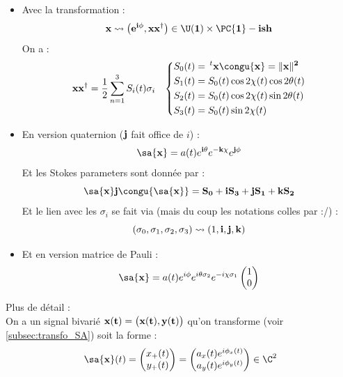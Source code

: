 \begin{itemize}
	
	\item Avec la transformation :
	\[\bf{x} \leadsto \big(e^{i\phi}, \bf{x}\bf{x}^\dagger\big)\in\U(1)\times \PC{1}-ish\]
	On a :
	\begin{align*}
		\bf{x}\bf{x}^\dagger &= \frac{1}{2}\sum_{n=1}^3 S_i(t)\sigma_i  &  \left\{\begin{aligned}
			S_0(t) &=\, ^t\bf{x}\congu{\bf{x}} = \|\bf{x}\|^2 \\
			S_1(t) &= S_0(t) \cos 2\chi(t)\cos 2\theta(t)\\
			S_2(t) &= S_0(t) \cos 2\chi(t)\sin 2\theta(t)\\
			S_3(t) &= S_0(t) \sin 2\chi(t)
		\end{aligned} \right.
	\end{align*}
	
	\item En version quaternion ($\bf{j}$ fait office de $i$) \cite{lefevre_polarization_2021} :
	\begin{equation}
		\sa{\bf{x}} = a(t)e^{\bf{i}\theta} e^{-\bf{k}\chi} e^{\bf{j}\phi}
	\end{equation}
	Et les Stokes parameters sont donnée par :
	\[\sa{\bf{x}} \bf{j} \congu{\sa{\bf{x}}} = S_0  +\bf{i}S_3 + \bf{j}S_1 + \bf{k}S_2\]
	Et le lien avec les $\sigma_i$ se fait via (mais du coup les notations colles par :/) :
	\[(\sigma_0, \sigma_1, \sigma_2, \sigma_3) \leadsto (1, \bf{i}, \bf{j}, \bf{k})\]
	
	\item Et en version matrice de Pauli :
	\begin{equation}
		\sa{\bf{x}} = a(t)e^{i\phi} e^{i\theta \sigma_2} e^{-i\chi \sigma_1} \begin{pmatrix} 1 \\ 0 \end{pmatrix}
	\end{equation}
\end{itemize}
\noindent
Plus de détail : \\ 

On a un signal bivarié $\bf{x}(t) = \big(x(t),y(t)\big)$ qu'on transforme (voir \cref{subsec:transfo_SA}) soit la forme :
\[\sa{\bf{x}}(t) = \begin{pmatrix}x_+(t) \\ y_+(t)\end{pmatrix} = \begin{pmatrix}a_x(t) e^{i\phi_x(t)} \\ a_y(t) e^{i\phi_y(t)}\end{pmatrix}\in\C^2\]
\\

